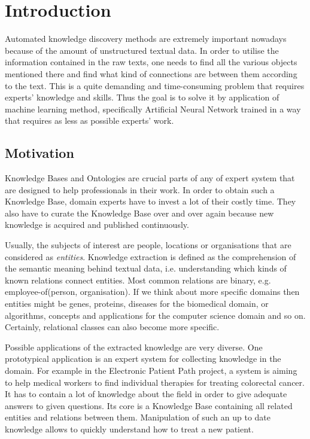 \chapter{Introduction}
\label{chapter:introduction}
Automated knowledge discovery methods are extremely important nowadays because of the 
amount of unstructured textual data. In order to utilise the information contained in the 
raw texts, one needs to find all the various objects mentioned there and find what kind of 
connections are between them according to the text. This is a quite demanding and 
time-consuming problem that requires experts' knowledge and skills. Thus the goal is to 
solve it by application of machine learning method, specifically Artificial Neural Network 
trained in a way that requires as less as possible experts' work.

\section{Motivation}
Knowledge Bases and Ontologies are crucial parts of any of expert system that are designed to
help professionals in their work. In order to obtain such a Knowledge Base, domain experts have to invest a lot of their costly time. They also have to curate the Knowledge Base over and over again because new knowledge is acquired and published continuously.

Usually, the subjects of interest are people, locations or organisations that are considered as 
\textit{entities}. Knowledge extraction is defined as the comprehension of the semantic meaning 
behind textual data, i.e. understanding which kinds of known relations connect entities.
Most common relations are binary, e.g. employee-of(person, organisation). If we think about 
more specific domains then entities might be genes, proteins, diseases for the biomedical domain, or 
algorithms, concepts and applications for the computer science domain and so on. Certainly, relational
classes can also become more specific.
 
Possible applications of the extracted knowledge are very diverse. One prototypical application is an expert 
system for collecting knowledge in the domain. For example in the Electronic Patient Path project, a system is aiming to help medical workers to find individual therapies for treating colorectal cancer. It has to contain a lot of knowledge about the field in order to give
adequate answers to given questions. Its core is a Knowledge Base containing all related entities 
and relations between them. Manipulation of such an up to date knowledge allows to quickly  
understand how to treat a new patient.

